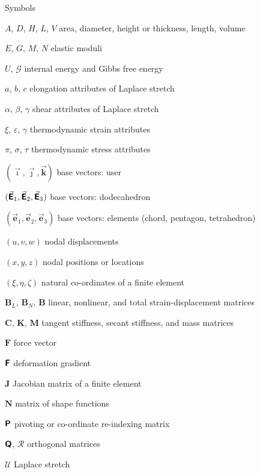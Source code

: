 
\medskip\medskip

\noindent
Symbols
\begin{namelist}{\hspace{2.5cm}}
    \item[$A$, $D$, $H$, $L$, $V$] area, diameter, height or thickness, length, volume
    \item[$E$, $G$, $M$, $N$] elastic moduli
    \item[$U$, $\mathcal{G}$] internal energy and Gibbs free energy
    \item[$a$, $b$, $c$] elongation attributes of Laplace stretch
    \item[$\alpha$, $\beta$, $\gamma$] shear attributes of Laplace stretch
    \item[$\xi$, $\varepsilon$, $\gamma$] thermodynamic strain attributes
    \item[$\pi$, $\sigma$, $\tau$] thermodynamic stress attributes
    \item[$( \vec{\boldsymbol{\imath}} , 
             \vec{\boldsymbol{\jmath}} ,
             \vec{\boldsymbol{k}})$] base vectors: user
    \item[$( \vec{\boldsymbol{\mathsf{E}}}_1 , \vec{\boldsymbol{\mathsf{E}}}_2 ,
             \vec{\boldsymbol{\mathsf{E}}}_3 )$] base vectors: dodecahedron
    \item[$( \vec{\mathbf{e}}_1 , \vec{\mathbf{e}}_2 ,
             \vec{\mathbf{e}}_3 )$] base vectors: elements 
             (chord, pentagon, tetrahedron)
    \item[$(u, v, w)$] nodal displacements
    \item[$(x, y, z)$] nodal positions or locations
    \item[$(\xi, \eta, \zeta)$] natural co-ordinates of a finite element
    \item[$\mathbf{B}_L$, $\mathbf{B}_N$, $\mathbf{B}$] linear, nonlinear,
          and total strain-displacement matrices
    \item[$\mathbf{C}$, $\mathbf{K}$, $\mathbf{M}$] tangent stiffness, 
          secant stiffness, and mass matrices
    \item[$\boldsymbol{F}$] force vector
    \item[$\boldsymbol{\mathsf{F}}$] deformation gradient
    \item[$\mathbf{J}$] Jacobian matrix of a finite element
    \item[$\mathbf{N}$] matrix of shape functions
    \item[$\boldsymbol{\mathsf{P}}$] pivoting or co-ordinate re-indexing matrix
    \item[$\boldsymbol{\mathsf{Q}}$, $\boldsymbol{\mathcal{R}}$] orthogonal matrices
    \item[$\boldsymbol{\mathcal{U}}$] Laplace stretch
\end{namelist}
